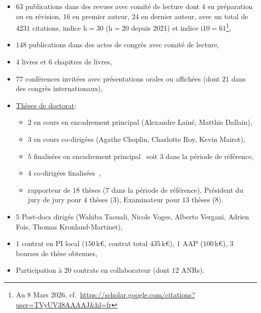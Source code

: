 \documentclass[10pt,french,a4paper,twoside]{article}%
\begin{document}
\begin{itemize}
	
\item	$63$ publications dans des revues avec comité de lecture dont $4$ en préparation ou en révision, $16$ en premier auteur, $24$ en dernier auteur, avec un total de $4231$ citations, indice h$=30$ (h$=20$ depuis 2021) et indice i10$=61$\footnote{Au 8 Mars 2026, cf.~\url{https://scholar.google.com/citations?user=TVyUV38AAAAJ&hl=fr}},
\item	$148$ publications dans des actes de congrès avec comité de lecture,
\item	$4$ livres et $6$ chapitres de livres,
\item	$77$ conférences invitées avec présentations orales
ou affichées (dont $21$ dans des congrès internationaux),
\item \href{https://www.theses.fr/074493701}{Thèses de doctorat}:
\begin{itemize}
	\item $2$ en cours en encadrement principal (Alexandre Lainé, Matthis Dallain),
	\item $3$ en cours co-dirigées (Agathe Choplin, Charlotte Roy, Kevin Mairot),
	\item $5$ finalisées en encadrement principal~\citep{Khoei14thesis,Boutin20thesis,Franciosini21thesis,Ladret24thesis,Grimaldi24thesis,Jeremie25thesis} soit $3$ dans la période de référence,
	\item $4$ co-dirigées finalisées~\citep{Kremkow09thesis,Damasse18thesis,MansourPour19thesis,Gruel23thesis},
	\item rapporteur de $18$ thèses ($7$ dans la période de référence), Président du jury de jury pour $4$ thèses ($3$), Examinateur pour $13$ thèses ($8$).
\end{itemize} %
\item $5$ Post-docs dirigés (Wahiba Taouali, Nicole Voges, Alberto Vergani, Adrien Fois, Thomas Kronland-Martinet),
\item $1$ contrat en PI local ($150$\,k€, contrat total $435$\,k€), 1 AAP ($100$\,k€), $3$ bourses de thèse obtenues,
\item Participation à $20$ contrats en collaborateur (dont $12$ ANRs).


\end{itemize} %
%
\end{document}
